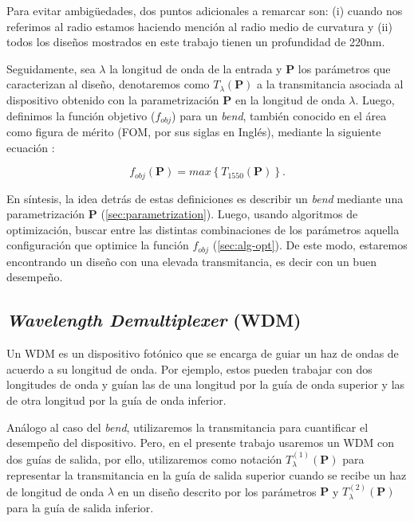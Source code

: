 Para evitar ambigüedades, dos puntos adicionales a remarcar son: 
(i) cuando nos referimos al radio estamos haciendo mención al radio medio de curvatura y 
(ii) todos los diseños mostrados en este trabajo tienen un profundidad de 220nm.


Seguidamente, sea $\lambda$ la longitud de onda de la entrada y $\boldsymbol{P}$ los parámetros que caracterizan al
diseño, denotaremos como $T_{\lambda}(\boldsymbol{P})$ a la transmitancia asociada al dispositivo obtenido con la
parametrización $\boldsymbol{P}$ en la longitud de onda $\lambda$. Luego, definimos la función objetivo 
($f_{obj}$) para un \emph{bend}, también conocido en el área como figura de mérito (FOM, por sus siglas en
Inglés), 
mediante la siguiente ecuación \citep{Su2020}:

\begin{equation}
  f_{obj}(\boldsymbol{P}) = max \left \{ T_{1550} (\boldsymbol{P}) \right \}.
\label{eq:fom-bend}
\end{equation}

En síntesis, la idea detrás de estas definiciones es describir un \emph{bend} mediante una parametrización
$\boldsymbol{P}$
(\autoref{sec:parametrization}).
Luego, usando algoritmos de optimización, buscar entre las distintas combinaciones de los parámetros aquella configuración
que optimice la función $f_{obj}$ (\autoref{sec:alg-opt}).
De este modo, estaremos encontrando un diseño con una elevada transmitancia, es decir con un buen desempeño.

\subsection{\emph{Wavelength Demultiplexer} (WDM)}

Un WDM es un dispositivo fotónico que se encarga de guiar un haz de ondas de acuerdo a su longitud de onda.
Por ejemplo, estos pueden trabajar con dos longitudes de onda y guían las de una longitud por la guía de onda superior
y las de otra longitud por la guía de onda inferior.

Análogo al caso del \emph{bend}, utilizaremos la transmitancia para cuantificar el desempeño del dispositivo.
Pero, en el presente trabajo usaremos un WDM con dos guías de salida, por ello, utilizaremos como notación
$T_{\lambda}^{(1)}(\boldsymbol{P})$ para
representar la transmitancia en la guía de salida superior cuando se recibe un haz de longitud de onda
$\lambda$ en un diseño descrito por los parámetros $\boldsymbol{P}$ y $T_{\lambda}^{(2)}(\boldsymbol{P})$ para la guía de salida inferior.

